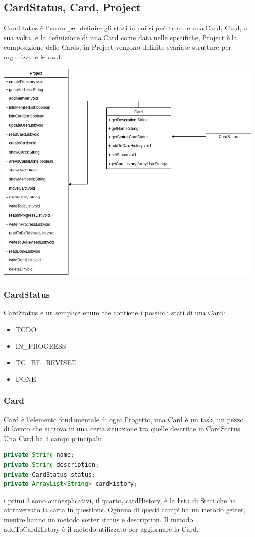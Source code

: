 \documentclass[]{article}
\begin{document}
\subsection{CardStatus, Card, Project}
CardStatus è l'enum per definire gli stati in cui si può trovare una Card, Card, a sua volta, è la definizione di una Card come data nelle specifiche, Project è la composizione delle Cards, in Project vengono definite svariate strutture per organizzare le card.	
\begin{center}
	\includegraphics[width=1\textwidth]{architecture}
\end{center}
\subsubsection{CardStatus}
CardStatus è un semplice enum che contiene i possibili stati di una Card:
\begin{itemize}
	\item TODO
	\item IN\_PROGRESS
	\item TO\_BE\_REVISED
	\item DONE
\end{itemize}
\subsubsection{Card}
Card è l'elemento fondamentale di ogni Progetto, una Card è un task, un pezzo di lavoro che si trova in una certa situazione tra quelle descritte in CardStatus. Una Card ha 4 campi principali: 
\begin{lstlisting}[language=java]
private String name;
private String description;
private CardStatus status;
private ArrayList<String> cardHistory;
\end{lstlisting}
i primi 3 sono autoesplicativi, il quarto, cardHistory, è la lista di Stati che ha attraversato la carta in questione.
Ognuno di questi campi ha un metodo getter, mentre hanno un metodo setter status e description. Il metodo addToCardHistory è il metodo utilizzato per aggiornare la Card.
\end{document}
